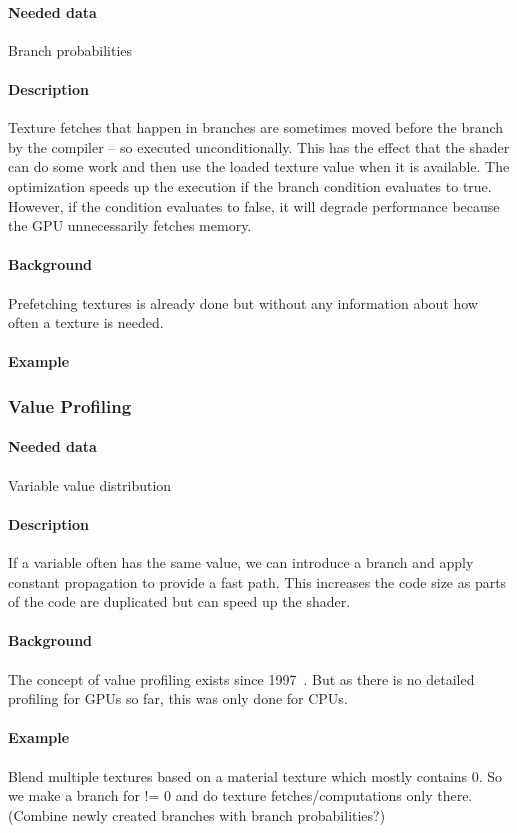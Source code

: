 \paragraph{Needed data} Branch probabilities
\paragraph{Description} Texture fetches that happen in branches are sometimes moved before the branch by the compiler -- so executed unconditionally. This has the effect that the shader can do some work and then use the loaded texture value when it is available. The optimization speeds up the execution if the branch condition evaluates to true. However, if the condition evaluates to false, it will degrade performance because the GPU unnecessarily fetches memory.
\paragraph{Background} Prefetching textures is already done but without any information about how often a texture is needed.
\paragraph{Example}

\subsubsection{Value Profiling}
\paragraph{Needed data} Variable value distribution
\paragraph{Description} If a variable often has the same value, we can introduce a branch and apply constant propagation to provide a fast path. This increases the code size as parts of the code are duplicated but can speed up the shader.
\paragraph{Background} The concept of value profiling exists since 1997~\cite{Calder1997}. But as there is no detailed profiling for GPUs so far, this was only done for CPUs.
\paragraph{Example} Blend multiple textures based on a material texture which mostly contains 0. So we make a branch for != 0 and do texture fetches/computations only there. (Combine newly created branches with branch probabilities?)

